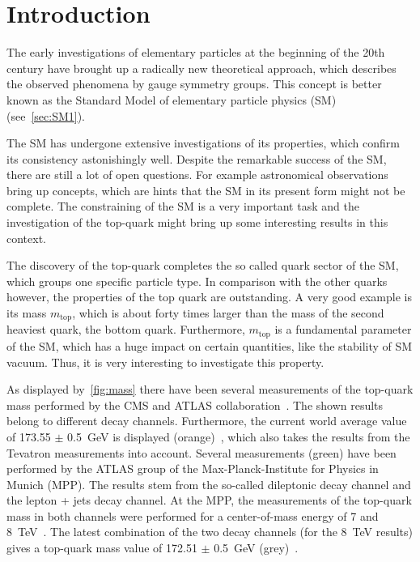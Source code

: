 \chapter{Introduction}

\label{sec:intro}

The early investigations of elementary particles at the beginning of the 20th century have brought up a radically new theoretical approach, which describes the observed phenomena by gauge symmetry groups. This concept is better known as the Standard Model of elementary particle physics (SM) (see~\cref{sec:SM1}).

The SM has undergone extensive investigations of its properties, which confirm its consistency astonishingly well. Despite the remarkable success of the SM, there are still a lot of open questions. For example astronomical observations  bring up concepts, which are hints that the SM in its present form might not be complete. The constraining of the SM  is a very important task and the investigation of the top-quark might bring up some interesting results in this context. 

The discovery of the top-quark completes the so called quark sector of the SM, which groups one specific particle type. In comparison with the other quarks however, the properties of the top quark are outstanding. A very good example  is its mass $m_{\text{top}}$, which is about forty times larger than the mass of the second heaviest quark, the bottom quark. Furthermore, $m_{\text{top}}$ is a fundamental parameter of the SM, which has a huge impact on certain quantities, like the stability of SM vacuum.  Thus, it is very interesting to investigate this property.

As displayed by~\cref{fig:mass} there have been several measurements of the top-quark mass performed by the CMS and ATLAS collaboration~\cite{PubR}. The shown results belong to different decay channels. Furthermore, the current world average value of 173.55 $\pm$ 0.5~GeV is displayed (orange)~\cite{ATLAS:2014wva}, which also takes the results from the Tevatron measurements into account. Several measurements (green) have been performed by the ATLAS group of the Max-Planck-Institute for Physics in Munich (MPP). The results stem from the so-called dileptonic decay channel and the lepton + jets decay channel. At the MPP, the measurements of the top-quark mass in both channels were performed for a center-of-mass energy of 7 and 8~TeV~\cite{Aad:2015nba,Aaboud:2016igd,ATLAS-CONF-2017-071}. 
The latest combination of the two decay channels  (for the  8~TeV results) gives a top-quark mass value of 172.51 $\pm$ 0.5~GeV (grey)~\cite{ATLAS-CONF-2017-071}.





